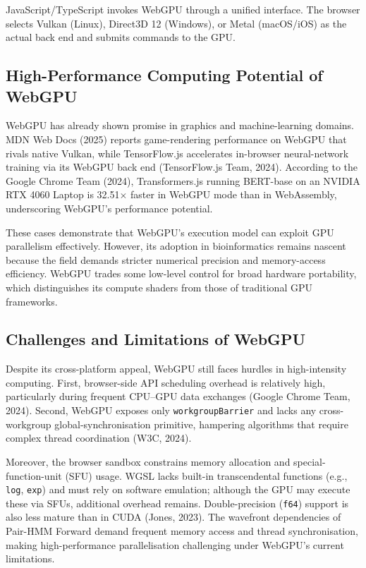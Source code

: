 \documentclass[PhD]{PHlab-thesis}
\begin{document}
JavaScript/TypeScript invokes WebGPU through a unified interface. The browser selects Vulkan (Linux), Direct3D 12 (Windows), or Metal (macOS/iOS) as the actual back end and submits commands to the GPU.

\subsection{High-Performance Computing Potential of WebGPU}
WebGPU has already shown promise in graphics and machine-learning domains. MDN Web Docs (2025) reports game-rendering performance on WebGPU that rivals native Vulkan, while TensorFlow.js accelerates in-browser neural-network training via its WebGPU back end (TensorFlow.js Team, 2024). According to the Google Chrome Team (2024), Transformers.js running BERT-base on an NVIDIA RTX 4060 Laptop is 32.51$\times$ faster in WebGPU mode than in WebAssembly, underscoring WebGPU's performance potential.

These cases demonstrate that WebGPU's execution model can exploit GPU parallelism effectively. However, its adoption in bioinformatics remains nascent because the field demands stricter numerical precision and memory-access efficiency. WebGPU trades some low-level control for broad hardware portability, which distinguishes its compute shaders from those of traditional GPU frameworks.

\subsection{Challenges and Limitations of WebGPU}
Despite its cross-platform appeal, WebGPU still faces hurdles in high-intensity computing. First, browser-side API scheduling overhead is relatively high, particularly during frequent CPU–GPU data exchanges (Google Chrome Team, 2024). Second, WebGPU exposes only \texttt{workgroupBarrier} and lacks any cross-workgroup global-synchronisation primitive, hampering algorithms that require complex thread coordination (W3C, 2024).

Moreover, the browser sandbox constrains memory allocation and special-function-unit (SFU) usage. WGSL lacks built-in transcendental functions (e.g., \texttt{log}, \texttt{exp}) and must rely on software emulation; although the GPU may execute these via SFUs, additional overhead remains. Double-precision (\texttt{f64}) support is also less mature than in CUDA (Jones, 2023). The wavefront dependencies of Pair-HMM Forward demand frequent memory access and thread synchronisation, making high-performance parallelisation challenging under WebGPU's current limitations.
\end{document}
